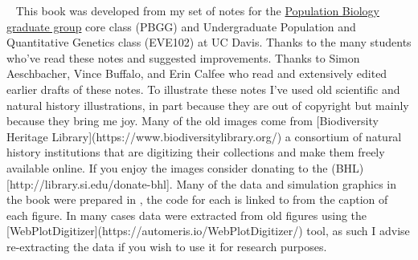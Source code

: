 \documentclass{tufte-book}
\begin{document}
\begin{fullwidth}
~\vfill
\thispagestyle{empty}
\setlength{\parindent}{0pt}
\setlength{\parskip}{\baselineskip}
  \small This book was developed from my set of notes for the \href{http://www-eve.ucdavis.edu/eve/pbg/}{Population
  Biology graduate group} core class (PBGG) and Undergraduate Population and
  Quantitative Genetics class (EVE102) at UC Davis. Thanks to the many
  students who've read these notes and suggested improvements. Thanks to Simon Aeschbacher, Vince Buffalo, and Erin Calfee who read
 and extensively edited earlier drafts of these notes. To illustrate these notes I've used old scientific and natural history illustrations, in part
 because they are out of copyright but mainly because they bring me joy. Many of the old images come from
[Biodiversity Heritage
   Library](https://www.biodiversitylibrary.org/) a consortium of natural history institutions that are
 digitizing their collections and make them freely available
 online. If you enjoy the images consider donating to the
(BHL)[http://library.si.edu/donate-bhl]. Many of the data and
 simulation graphics in the book were prepared in \citet{Rstats},
 the code for each is linked to from the caption of each figure. In many cases
 data were extracted from old figures using the
 [WebPlotDigitizer](https://automeris.io/WebPlotDigitizer/)
 tool, as such I advise re-extracting the data if you wish to use it
 for research purposes. 
\end{fullwidth}

\tableofcontents




%




%

%

\end{document}
